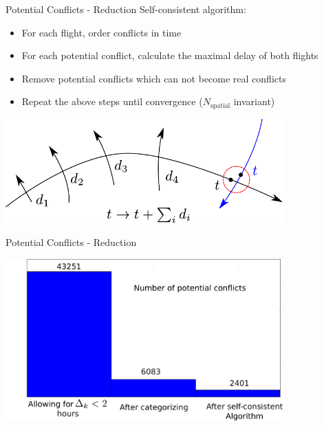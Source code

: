 \documentclass[10pt]{beamer}
\begin{document}
\begin{frame}[t]{Potential Conflicts - Reduction}
    Self-consistent algorithm:
    \begin{itemize}
        \item For each flight, order conflicts in time
        \item For each potential conflict, calculate the maximal delay of both flights
        \item Remove potential conflicts which can not become real conflicts
        \item Repeat the above steps until convergence ($N_\text{spatial}$ invariant) 
    \end{itemize}
    \begin{center}
        \includegraphics[width=0.8\textwidth]{images/potential_conflict_detection.pdf}
    \end{center}
\end{frame}
\begin{frame}[t]{Potential Conflicts - Reduction}
    \begin{center}
        \hspace{-1.5cm}
        \includegraphics[width=0.8\textwidth]{images/potential_conflict_reduction.pdf}
    \end{center}
\end{frame}
\end{document}
